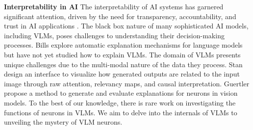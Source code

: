 \noindent\textbf{Interpretability in AI} The interpretability of AI systems has garnered significant attention, driven by the need for transparency, accountability, and trust in AI applications \cite{xu2019explainable, naveed2023comprehensive, bills2023language, rai2024practical,singh2024rethinking, bereska2024mechanistic}. The black box nature of many sophisticated AI models, including VLMs, poses challenges to understanding their decision-making processes. Bills \etal \cite{bills2023language} explore automatic explanation mechanisms for language models but have not yet studied how to explain VLMs. The domain of VLMs presents unique challenges due to the multi-modal nature of the data they process. Stan \etal~\cite{stan2024lvlm} design an interface to visualize how generated outputs are related to the input image through raw attention, relevancy maps, and causal interpretation. Guertler \etal \cite{guertler2024tellme} propose a method to generate and evaluate explanations for neurons in vision models. To the best of our knowledge, there is rare work on investigating the functions of neurons in VLMs. We aim to delve into the internals of VLMs to unveiling the mystery of VLM neurons.